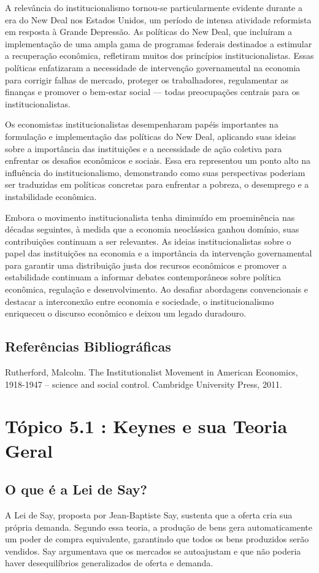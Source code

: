 \documentclass[a4paper,12pt]{article}[abntex2]
\begin{document}
A relevância do institucionalismo tornou-se particularmente evidente durante a era do New Deal nos Estados Unidos, um período de intensa atividade reformista em resposta à Grande Depressão. As políticas do New Deal, que incluíram a implementação de uma ampla gama de programas federais destinados a estimular a recuperação econômica, refletiram muitos dos princípios institucionalistas. Essas políticas enfatizaram a necessidade de intervenção governamental na economia para corrigir falhas de mercado, proteger os trabalhadores, regulamentar as finanças e promover o bem-estar social — todas preocupações centrais para os institucionalistas.

Os economistas institucionalistas desempenharam papéis importantes na formulação e implementação das políticas do New Deal, aplicando suas ideias sobre a importância das instituições e a necessidade de ação coletiva para enfrentar os desafios econômicos e sociais. Essa era representou um ponto alto na influência do institucionalismo, demonstrando como suas perspectivas poderiam ser traduzidas em políticas concretas para enfrentar a pobreza, o desemprego e a instabilidade econômica.

Embora o movimento institucionalista tenha diminuído em proeminência nas décadas seguintes, à medida que a economia neoclássica ganhou domínio, suas contribuições continuam a ser relevantes. As ideias institucionalistas sobre o papel das instituições na economia e a importância da intervenção governamental para garantir uma distribuição justa dos recursos econômicos e promover a estabilidade continuam a informar debates contemporâneos sobre política econômica, regulação e desenvolvimento. Ao desafiar abordagens convencionais e destacar a interconexão entre economia e sociedade, o institucionalismo enriqueceu o discurso econômico e deixou um legado duradouro.

\subsection{\textbf{Referências Bibliográficas}}
Rutherford, Malcolm. The Institutionalist Movement in American Economics, 1918-1947 –
science and social control. Cambridge University Press, 2011.

\newpage
\section{\textbf{Tópico 5.1 : Keynes e sua Teoria Geral}}
\subsection{\textbf{O que é a Lei de Say?}}
A Lei de Say, proposta por Jean-Baptiste Say, sustenta que a oferta cria sua própria demanda. Segundo essa teoria, a produção de bens gera automaticamente um poder de compra equivalente, garantindo que todos os bens produzidos serão vendidos. Say argumentava que os mercados se autoajustam e que não poderia haver desequilíbrios generalizados de oferta e demanda.
\end{document}
